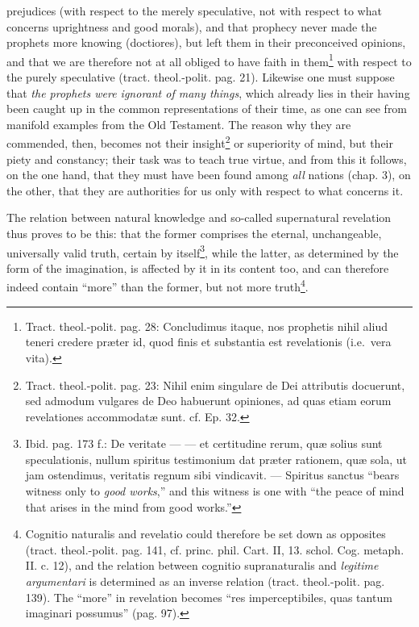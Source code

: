 \documentclass[12pt,a4paper,openany]{book}
\newcommand{\opage}[1]{\marginnote{\footnotesize\textit{[#1]}}}
\begin{document}
\opage{152}\setcounter{footnote}{0}prejudices (with respect to the merely speculative, not with respect to what concerns uprightness and good morals), and that prophecy never made the prophets more knowing (doctiores), but left them in their preconceived opinions, and that we are therefore not at all obliged to have faith in them\footnote{Tract. theol.-polit. pag. 28: Concludimus itaque, nos prophetis nihil aliud teneri credere præter id, quod finis et substantia est revelationis (i.e.\ vera vita).} with respect to the purely speculative (tract. theol.-polit. pag. 21). Likewise one must suppose that \emph{the prophets were ignorant of many things}, which already lies in their having been caught up in the common representations of their time, as one can see from manifold examples from the Old Testament. The reason why they are commended, then, becomes not their insight\footnote{Tract. theol.-polit. pag. 23: Nihil enim singulare de Dei attributis docuerunt, sed admodum vulgares de Deo habuerunt opiniones, ad quas etiam eorum revelationes accommodatæ sunt. cf. Ep. 32.} or superiority of mind, but their piety and constancy; their task was to teach true virtue, and from this it follows, on the one hand, that they must have been found among \emph{all} nations (chap. 3), on the other, that they are authorities for us only with respect to what concerns it.

The relation between natural knowledge and so-called supernatural revelation thus proves to be this: that the former comprises the eternal, unchangeable, universally valid truth, certain by itself\footnote{Ibid. pag. 173 f.: De veritate --- --- et certitudine rerum, quæ solius sunt speculationis, nullum spiritus testimonium dat præter rationem, quæ sola, ut jam ostendimus, veritatis regnum sibi vindicavit. --- Spiritus sanctus ``bears witness only to \emph{good works},'' and this witness is one with ``the peace of mind that arises in the mind from good works.''}, while the latter, as determined by the form of the imagination, is affected by it in its content too, and can therefore indeed contain ``more'' than the former, but not more truth\footnote{Cognitio naturalis and revelatio could therefore be set down as opposites (tract. theol.-polit. pag. 141, cf. princ. phil. Cart. II, 13. schol. Cog. metaph. II. c. 12), and the relation between cognitio supranaturalis and \emph{legitime argumentari} is determined as an inverse relation (tract. theol.-polit. pag. 139). The ``more'' in revelation becomes ``res imperceptibiles, quas tantum imaginari possumus'' (pag. 97).}.
\end{document}

